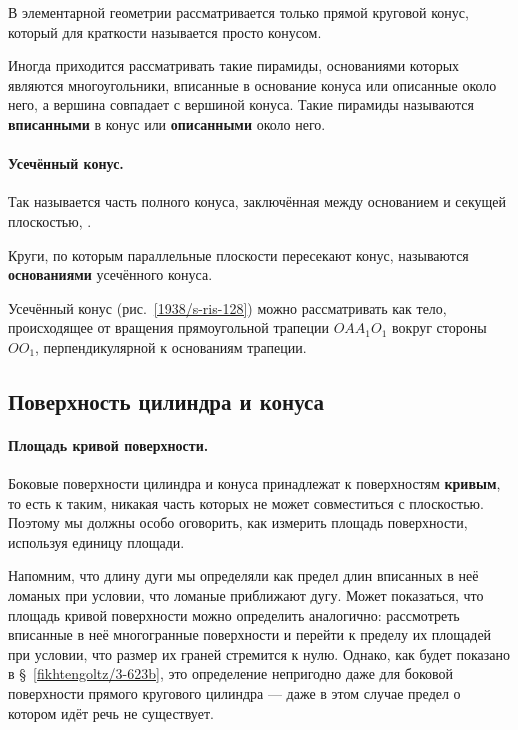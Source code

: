 В элементарной геометрии рассматривается только прямой круговой конус, который для краткости называется просто конусом.

Иногда приходится рассматривать такие пирамиды, основаниями которых являются многоугольники, вписанные в основание конуса или описанные около него, а вершина совпадает с вершиной конуса.
Такие пирамиды называются \textbf{вписанными} в конус или \textbf{описанными} около него.

\paragraph{Усечённый конус.}\label{1938/s110}
Так называется часть полного конуса, заключённая между основанием и секущей плоскостью, .

Круги, по которым параллельные плоскости пересекают конус, называются \textbf{основаниями} усечённого конуса.

Усечённый конус (рис.~\ref{1938/s-ris-128}) можно рассматривать как тело, происходящее от вращения прямоугольной трапеции $OAA_1O_1$ вокруг стороны $OO_1$, перпендикулярной к основаниям трапеции.

\subsection*{Поверхность цилиндра и конуса}

\paragraph{Площадь кривой поверхности.}\label{1938/s111}
Боковые поверхности цилиндра и конуса принадлежат к поверхностям {}\textbf{кривым}, то есть к таким, никакая часть которых не может совместиться с плоскостью.
Поэтому мы должны особо оговорить, как измерить площадь  поверхности, используя  единицу площади.

Напомним, что длину дуги мы определяли как предел длин вписанных в неё ломаных при условии, что ломаные приближают дугу.
Может показаться, что площадь кривой поверхности можно определить аналогично: рассмотреть вписанные в неё многогранные поверхности и перейти к пределу их площадей при условии, что размер их граней стремится к нулю.
Однако, как будет показано в §~\ref{fikhtengoltz/3-623b}, это определение непригодно даже для боковой поверхности прямого кругового цилиндра — даже в этом случае предел о котором идёт речь не существует.

